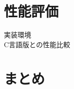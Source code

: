 \documentclass[paper]{ieicej}
\begin{document}
\section{性能評価}

実装環境\\

C言語版との性能比較


\section{まとめ}

\ack %

%
%
\begin{thebibliography}{99}%
\bibitem{}
\end{thebibliography}

\appendix
\section{}

\begin{biography}
\profile{}{}{}
\end{biography}
\end{document}
